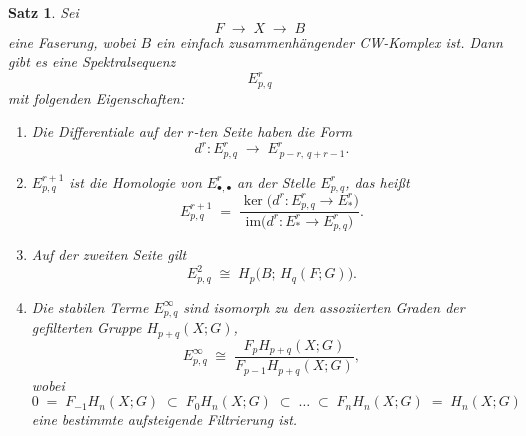 \documentclass[12pt]{article}
\numberwithin{conj}{section}
\newtheorem{theorem}[conj]{Satz}
\begin{document}
                \begin{theorem}{\cite[Proposition 4E.1]{hatcher2001}}
                    \label{thm:SerreSpectralSequence}
                    Sei 
                    \[
                        F \;\longrightarrow\; X \;\longrightarrow\; B
                    \]
                    eine Faserung, wobei $B$ ein einfach zusammenhängender CW-Komplex ist. Dann gibt es eine Spektralsequenz 
                    \[
                        E^r_{p,q}
                    \]
                    mit folgenden Eigenschaften:
                    \begin{enumerate}[label=(\alph*)]
                        \item Die Differentiale auf der $r$-ten Seite haben die Form
                              \[
                                d^r : E^r_{p,q} \;\longrightarrow\; E^r_{\,p-r,\,q+r-1}.
                              \]
                        \item $E^{r+1}_{p,q}$ ist die Homologie von $E^r_{\bullet,\bullet}$ an der Stelle $E^r_{p,q}$, 
                              das heißt
                              \[
                                E^{r+1}_{p,q}
                                \;=\;
                                \frac{\ker\bigl(d^r : E^r_{p,q} \to E^r_{\!*}\bigr)}{\mathrm{im}\bigl(d^r : E^r_{\!*} \to E^r_{p,q}\bigr)}.
                              \]
                        \item Auf der zweiten Seite gilt
                              \[
                                E^2_{p,q}
                                \;\cong\;
                                H_{p}\bigl(B;\,H_{q}(F;G)\bigr).
                              \]
                        \item Die stabilen Terme $E^\infty_{p,q}$ sind isomorph zu den assoziierten Graden der gefilterten Gruppe $H_{p+q}(X;G)$,
                              \[
                                E^\infty_{p,q}
                                \;\cong\;
                                \frac{F_pH_{p+q}(X;G)}{F_{p-1}H_{p+q}(X;G)},
                              \]
                              wobei 
                              \[
                                0
                                \;=\;
                                F_{-1}H_{n}(X;G)
                                \;\subset\;
                                F_0H_{n}(X;G)
                                \;\subset\;
                                \dots
                                \;\subset\;
                                F_nH_{n}(X;G)
                                \;=\;
                                H_{n}(X;G)
                              \]
                              eine bestimmte aufsteigende Filtrierung ist.
                    \end{enumerate}
                \end{theorem}
                
\end{document}
